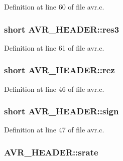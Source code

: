Definition at line 60 of file avr.\+c.

\subsubsection[{\texorpdfstring{res3}{res3}}]{\setlength{\rightskip}{0pt plus 5cm}short A\+V\+R\+\_\+\+H\+E\+A\+D\+E\+R\+::res3}\hypertarget{struct_a_v_r___h_e_a_d_e_r_a7943744922d5676c1734bd8489b9a5ee}{}\label{struct_a_v_r___h_e_a_d_e_r_a7943744922d5676c1734bd8489b9a5ee}


Definition at line 61 of file avr.\+c.

\subsubsection[{\texorpdfstring{rez}{rez}}]{\setlength{\rightskip}{0pt plus 5cm}short A\+V\+R\+\_\+\+H\+E\+A\+D\+E\+R\+::rez}\hypertarget{struct_a_v_r___h_e_a_d_e_r_a48cd5e735a4a96360eacfa0fe9d2c82f}{}\label{struct_a_v_r___h_e_a_d_e_r_a48cd5e735a4a96360eacfa0fe9d2c82f}


Definition at line 46 of file avr.\+c.

\subsubsection[{\texorpdfstring{sign}{sign}}]{\setlength{\rightskip}{0pt plus 5cm}short A\+V\+R\+\_\+\+H\+E\+A\+D\+E\+R\+::sign}\hypertarget{struct_a_v_r___h_e_a_d_e_r_aae30b47df8e938f0817ef017e7da211e}{}\label{struct_a_v_r___h_e_a_d_e_r_aae30b47df8e938f0817ef017e7da211e}


Definition at line 47 of file avr.\+c.

\subsubsection[{\texorpdfstring{srate}{srate}}]{ A\+V\+R\+\_\+\+H\+E\+A\+D\+E\+R\+::srate}\hypertarget{struct_a_v_r___h_e_a_d_e_r_a8df917f423ed8e474cdca8fbf117cec0}{}\label{struct_a_v_r___h_e_a_d_e_r_a8df917f423ed8e474cdca8fbf117cec0}



